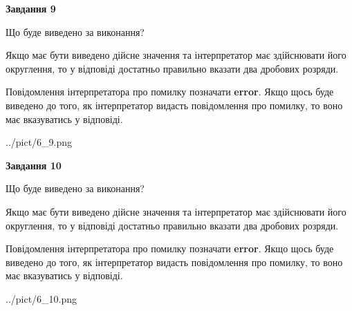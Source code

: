 \documentclass[12pt, ukrainian]{article}
\begin{document}
{\begin {Large}
{\begin {center}\textbf{Завдання 9}\end {center}}\par
Що буде виведено за виконання? \par

Якщо має бути виведено дійсне значення та інтерпретатор має здійснювати його округлення, 
то у відповіді достатньо правильно вказати два дробових розряди.

Повідомлення інтерпретатора про помилку позначати \textbf{error}.
Якщо щось буде виведено до того, як інтерпретатор видасть повідомлення про помилку, 
то воно має вказуватись у відповіді. \par

\begin{center}
	{../pict/6_9.png}
\end{center}
\newpage

{\begin {center}\textbf{Завдання 10}\end {center}}\par
Що буде виведено за виконання? \par

Якщо має бути виведено дійсне значення та інтерпретатор має здійснювати його округлення, 
то у відповіді достатньо правильно вказати два дробових розряди.

Повідомлення інтерпретатора про помилку позначати \textbf{error}.
Якщо щось буде виведено до того, як інтерпретатор видасть повідомлення про помилку, 
то воно має вказуватись у відповіді. \par

\begin{center}
	{../pict/6_10.png}
\end{center}
\newpage

\end {Large}}
\end{document}
